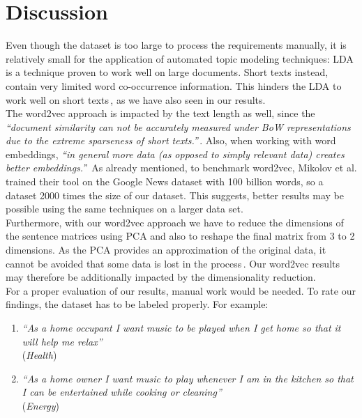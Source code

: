 \section{Discussion}
\label{sec:discussion}
Even though the \crowdre{} dataset is too large to process the requirements manually, it is relatively small for the application of automated topic modeling techniques: LDA is a technique proven to work well on large documents. Short texts instead, contain very limited word co-occurrence information. This hinders the LDA to work well on short texts\,\cite{quan_short_2015}, as we have also seen in our results.\\
The word2vec approach is impacted by the text length as well, since the \textit{``document similarity can not be accurately measured under BoW representations due to the extreme sparseness of short texts.''}\,\cite{li_classifying_2019}. Also, when working with word embeddings, \textit{``in general more data (as opposed to simply relevant data) creates better embeddings.''}\,\cite{kusner_word_2015} As already mentioned, to benchmark word2vec, Mikolov et al. trained their tool on the Google News dataset with 100 billion words, so a dataset 2000 times the size of our dataset. This suggests, better results may be possible using the same techniques on a larger data set.\\
Furthermore, with our word2vec approach we have to reduce the dimensions of the sentence matrices using PCA and also to reshape the final matrix from 3 to 2 dimensions. As the PCA provides an approximation of the original data, it cannot be avoided that some data is lost in the process\,\cite{wold_principal_1987}. Our word2vec results may therefore be additionally impacted by the dimensionality reduction.\\

For a proper evaluation of our results, manual work would be needed. To rate our findings, the dataset has to be labeled properly. For example:

\begin{enumerate}[RE1:]
	\item \textit{``As a home occupant I want music to be played when I get home so that it will help me relax''}\\(\emph{Health})
	\item \textit{``As a home owner I want music to play whenever I am in the kitchen so that I can be entertained while cooking or cleaning''}\\(\emph{Energy})
\end{enumerate}
 
